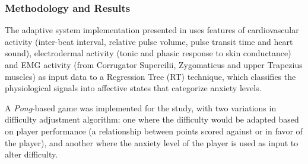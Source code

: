 \subsubsection{Methodology and Results}



The adaptive system implementation presented in \cite{article_affectivedda} uses features of cardiovascular activity (inter-beat interval, relative pulse volume, pulse transit time and heart sound), electrodermal activity (tonic and phasic response to skin conductance) and EMG activity (from Corrugator Supercilii, Zygomaticus and upper Trapezius muscles) as input data to a Regression Tree (RT) technique, which classifies the physiological signals into affective states that categorize anxiety levels.

A \emph{Pong}-based game was implemented for the study, with two variations in difficulty adjustment algorithm: one where the difficulty would be adapted based on player performance (a relationship between points scored against or in favor of the player), and another where the anxiety level of the player is used as input to alter difficulty.

